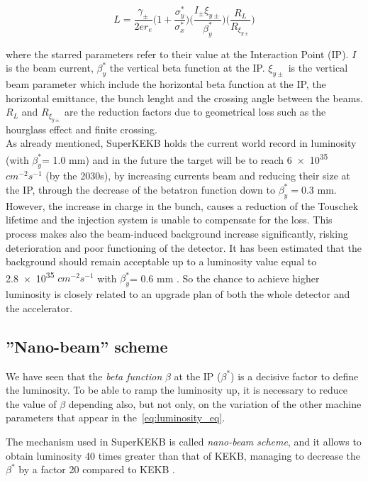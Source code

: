 \begin{equation} \label{eq:luminosity_eq}
L = \frac{\gamma_{\pm}}{2er_{e}} \bigg(1 + \frac{\sigma_{y}^{*}}{\sigma_{x}^{*}} \bigg) \bigg(\frac{I_{\pm}\xi_{y\pm}}{\beta^{*}_{y}} \bigg) \bigg(\frac{R_{L}}{R_{\xi_{y\pm}}} \bigg)
\end{equation}

where the starred parameters refer to their value at the Interaction Point (IP).  $I$ is the beam current, $\beta_{y}^{*}$ the vertical beta function at the IP. $\xi_{y\pm}$ is the vertical beam parameter which include the horizontal beta function at the IP, the horizontal emittance, the bunch lenght and the crossing angle between the beams. $R_{L}$ and $R_{\xi_{y\pm}}$ are the reduction factors due to geometrical loss such as the hourglass effect and finite crossing.\\

As already mentioned, SuperKEKB holds the current world record in luminosity (with $\beta^{*}_{y}$= 1.0 mm) and in the future the target will be to reach \num{6e35} $cm^{-2} s^{-1}$ (by the 2030s), by increasing currents beam and reducing their size at the IP, through the decrease of the betatron function down to $\beta^{*}_{y}= 0.3$ mm. 
However, the increase in charge in the bunch, causes a reduction of the Touschek lifetime and the injection system is unable to compensate for the loss.
This process makes also the beam-induced background increase significantly, risking deterioration and poor functioning of the detector.
It has been estimated that the background should remain acceptable up to a luminosity value equal to \num{2.8e35} $cm^{-2} s^{-1}$ with $\beta^{*}_{y}$= 0.6 mm \cite{Natochii:2022vcs}. So the chance to achieve higher luminosity is closely related to an upgrade plan of both the whole detector and the accelerator.


\subsection{''Nano-beam'' scheme} \label{sec:nano_beam}

We have seen that the \textit{beta function} $\beta$ at the IP ($\beta^{*}$) is a decisive factor to define the luminosity. To be able to ramp the luminosity up, it is necessary to reduce the value of $\beta$ depending also, but not only, on the variation of the other machine parameters that appear in the~\autoref{eq:luminosity_eq}.

The mechanism used in SuperKEKB is called \textit{nano-beam scheme}, and it allows to obtain luminosity 40 times greater than that of KEKB, managing to decrease the $\beta^{*}$ by a factor 20 compared to KEKB \cite{Ohnishi:2013fma}.\\

